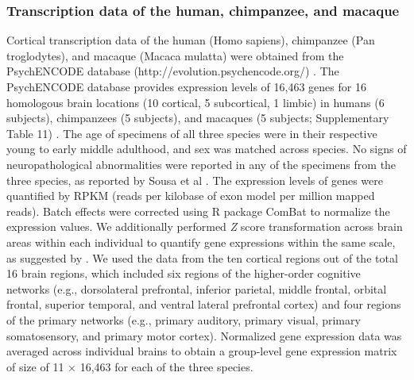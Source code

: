 \begin{refsection}
\subsubsection*{Transcription data of the human, chimpanzee, and macaque}
Cortical transcription data of the human (Homo sapiens), chimpanzee (Pan troglodytes), and macaque (Macaca mulatta) were obtained from the PsychENCODE database (http://evolution.psychencode.org/) \citep{sousa2017molecular}. The PsychENCODE database provides expression levels of 16,463 genes for 16 homologous brain locations (10 cortical, 5 subcortical, 1 limbic) in humans (6 subjects), chimpanzees (5 subjects), and macaques (5 subjects; Supplementary Table 11) \citep{sousa2017molecular}. The age of specimens of all three species were in their respective young to early middle adulthood, and sex was matched across species. No signs of neuropathological abnormalities were reported in any of the specimens from the three species, as reported by Sousa et al \citep{sousa2017molecular}. The expression levels of genes were quantified by RPKM (reads per kilobase of exon model per million mapped reads). Batch effects were corrected using R package ComBat \citep{Team2014RAL} to normalize the expression values. We additionally performed \textit{Z} score transformation across brain areas within each individual to quantify gene expressions within the same scale, as suggested by \citep{Arnatkeviciute2018APG}. We used the data from the ten cortical regions out of the total 16 brain regions, which included six regions of the higher-order cognitive networks (e.g., dorsolateral prefrontal, inferior parietal, middle frontal, orbital frontal, superior temporal, and ventral lateral prefrontal cortex) and four regions of the primary networks (e.g., primary auditory, primary visual, primary somatosensory, and primary motor cortex). Normalized gene expression data was averaged across individual brains to obtain a group-level gene expression matrix of size of 11 $ \times $  16,463 for each of the three species.


\end{refsection}
